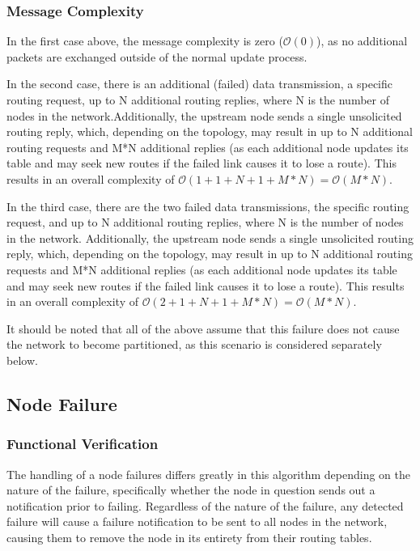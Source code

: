 \subsubsection{Message Complexity}
In the first case above, the message complexity is zero ($\mathcal{O}(0)$), as no additional packets are exchanged outside of the normal update process. 

In the second case, there is an additional (failed) data transmission, a specific routing request, up to N additional routing replies, where N is the number of nodes in the network.Additionally, the upstream node sends a single unsolicited routing reply, which, depending on the topology, may result in up to N additional routing requests and M*N additional replies (as each additional node updates its table and may seek new routes if the failed link causes it to lose a route). This results in an overall complexity of $\mathcal{O}(1 + 1 + N + 1 +M*N) = \mathcal{O}(M*N)$.

In the third case, there are the two failed data transmissions, the specific routing request, and up to N additional routing replies, where N is the number of nodes in the network. Additionally, the upstream node sends a single unsolicited routing reply, which, depending on the topology, may result in up to N additional routing requests and M*N additional replies (as each additional node updates its table and may seek new routes if the failed link causes it to lose a route). This results in an overall complexity of $\mathcal{O}(2 + 1 + N + 1 +M*N) = \mathcal{O}(M*N)$.

It should be noted that all of the above assume that this failure does not cause the network to become partitioned, as this scenario is considered separately below.

\subsection{Node Failure}\label{subsec:IPNodeFailure}
\subsubsection{Functional Verification}
The handling of a node failures differs greatly in this algorithm depending on the nature of the failure, specifically whether the node in question sends out a notification prior to failing. Regardless of the nature of the failure, any detected failure will cause a failure notification to be sent to all nodes in the network, causing them to remove the node in its entirety from their routing tables.


